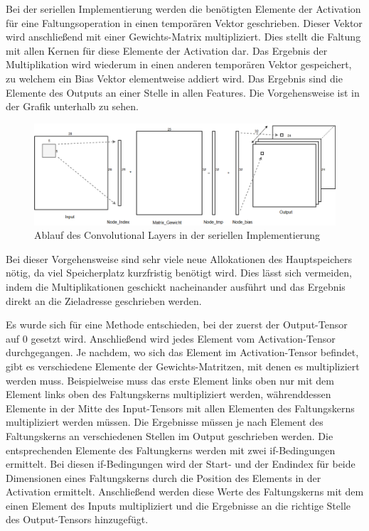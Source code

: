 \documentclass[../main.tex]{subfiles}
\begin{document}
Bei der seriellen Implementierung werden die benötigten Elemente der Activation für eine Faltungsoperation in einen temporären Vektor geschrieben. Dieser Vektor wird anschließend mit einer Gewichts-Matrix multipliziert. Dies stellt die Faltung mit allen Kernen für diese Elemente der Activation dar. Das Ergebnis der Multiplikation wird wiederum in einen anderen temporären Vektor gespeichert, zu welchem ein Bias Vektor elementweise addiert wird. Das Ergebnis sind die Elemente des Outputs an einer Stelle in allen Features. Die Vorgehensweise ist in der Grafik unterhalb zu sehen.

\begin{figure}[!htbp]
	\centering
	\includegraphics[width=\textwidth]{../images/Benz/Conv_Layer_Seriel.png} %
	\caption{Ablauf des Convolutional Layers in der seriellen Implementierung} 
	\label{fig:conv_layer_seriell}
\end{figure}


Bei dieser Vorgehensweise sind sehr viele neue Allokationen des Hauptspeichers nötig, da viel Speicherplatz kurzfristig benötigt wird. Dies lässt sich vermeiden, indem die Multiplikationen geschickt nacheinander ausführt und das Ergebnis direkt an die Zieladresse geschrieben werden. 

Es wurde sich für eine Methode entschieden, bei der zuerst der Output-Tensor auf 0 gesetzt wird. Anschließend wird jedes Element vom Activation-Tensor durchgegangen. Je nachdem, wo sich das Element im Activation-Tensor befindet, gibt es verschiedene Elemente der Gewichts-Matritzen, mit denen es multipliziert werden muss. Beispielweise muss das erste Element links oben nur mit dem Element links oben des Faltungskerns multipliziert werden, währenddessen Elemente in der Mitte des Input-Tensors mit allen Elementen des Faltungskerns multipliziert werden müssen. Die Ergebnisse müssen je nach Element des Faltungskerns an verschiedenen Stellen im Output geschrieben werden.
Die entsprechenden Elemente des Faltungkerns werden mit zwei if-Bedingungen ermittelt. Bei diesen if-Bedingungen wird der Start- und der Endindex für beide Dimensionen eines Faltungskerns durch die Position des Elements in der Activation ermittelt. Anschließend werden diese Werte des Faltungskerns mit dem einen Element des Inputs multipliziert und die Ergebnisse an die richtige Stelle des Output-Tensors hinzugefügt.
\end{document}
